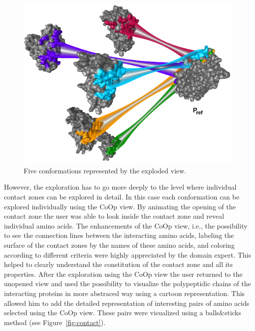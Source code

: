 \documentclass[journal]{vgtc}                %
\begin{document}
\begin{figure}[bt]
  \centering
  \includegraphics[width=1.0\columnwidth]{case2.png}
  \caption{Five conformations represented by the exploded view.}
  \label{fig:case2}
\end{figure}

However, the exploration has to go more deeply to the level where individual contact zones can be explored in detail.
In this case each conformation can be explored individually using the CoOp view.
By animating the opening of the contact zone the user was able to look inside the contact zone and reveal individual amino acids.
The enhancements of the CoOp view, i.e., the possibility to see the connection lines between the interacting amino acids, labeling the surface of the contact zones by the names of these amino acids, and coloring according to different criteria were highly appreciated by the domain expert.
This helped to clearly understand the constitution of the contact zone and all its properties.
After the exploration using the CoOp view the user returned to the unopened view and used the possibility to visualize the polypeptidic chains of the interacting proteins in more abstraced way using a cartoon representation. 
This allowed him to add the detailed representation of interesting pairs of amino acids selected using the CoOp view.
These pairs were visualized using a balls\&sticks method (see Figure~\ref{fig:contact}).
\end{document}
